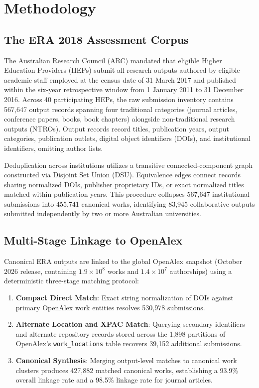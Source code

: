 \section{Methodology}\label{sec:methods}

\subsection{The ERA 2018 Assessment Corpus}
The Australian Research Council (ARC) mandated that eligible Higher Education Providers (HEPs) submit all research outputs authored by eligible academic staff employed at the census date of 31 March 2017 and published within the six-year retrospective window from 1 January 2011 to 31 December 2016. Across 40 participating HEPs, the raw submission inventory contains 567,647 output records spanning four traditional categories (journal articles, conference papers, books, book chapters) alongside non-traditional research outputs (NTROs). Output records record titles, publication years, output categories, publication outlets, digital object identifiers (DOIs), and institutional identifiers, omitting author lists.

Deduplication across institutions utilizes a transitive connected-component graph constructed via Disjoint Set Union (DSU). Equivalence edges connect records sharing normalized DOIs, publisher proprietary IDs, or exact normalized titles matched within publication years. This procedure collapses 567,647 institutional submissions into 455,741 canonical works, identifying 83,945 collaborative outputs submitted independently by two or more Australian universities.

\subsection{Multi-Stage Linkage to OpenAlex}
Canonical ERA outputs are linked to the global OpenAlex snapshot (October 2026 release, containing $1.9 \times 10^8$ works and $1.4 \times 10^7$ authorships) using a deterministic three-stage matching protocol:
\begin{enumerate}
    \item \textbf{Compact Direct Match}: Exact string normalization of DOIs against primary OpenAlex work entities resolves 530,978 submissions.
    \item \textbf{Alternate Location and XPAC Match}: Querying secondary identifiers and alternate repository records stored across the 1,898 partitions of OpenAlex's \texttt{work\_locations} table recovers 39,152 additional submissions.
    \item \textbf{Canonical Synthesis}: Merging output-level matches to canonical work clusters produces 427,882 matched canonical works, establishing a 93.9\% overall linkage rate and a 98.5\% linkage rate for journal articles.
\end{enumerate}

